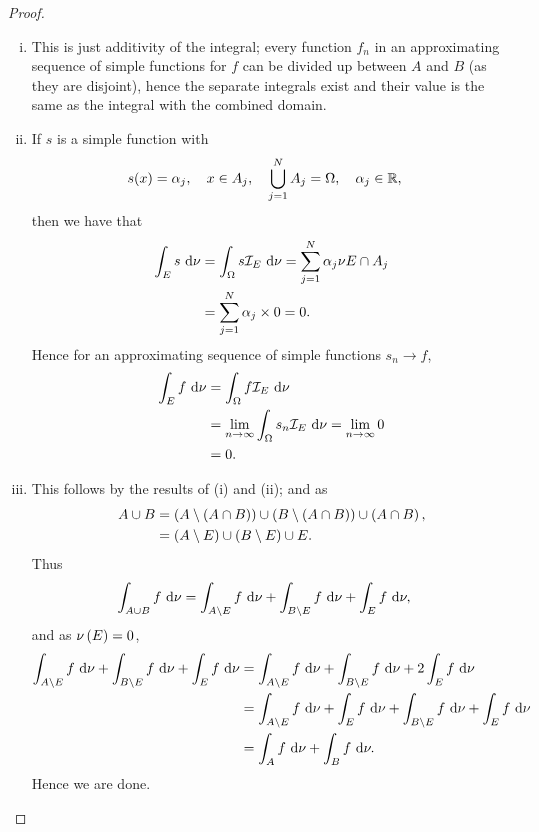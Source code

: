 \documentclass[11pt]{report}
\begin{document}
\begin{proof}
	\begin{enumerate}[(i)]
		\item This is just additivity of the integral; every function $f_n$ in an approximating sequence of simple functions for $f$ can be divided up between $A$ and $B$ (as they are disjoint), hence the separate integrals exist and their value is the same as the integral with the combined domain.
		\item If $s$ is a simple function with
		\begin{align*}
			s(x) &= \alpha_j, \quad x\in A_j, \quad \bigcup_{j=1}^{N} A_j=\Omega, \quad \alpha_j\in\mathbb{R},
		\end{align*}
		then we have that
		\begin{align*}
			\int_{E}s \ \mathrm{d}\nu &= \int_{\Omega}s\mathcal{I}_{E} \ \mathrm{d}\nu = \sum_{j=1}^{N} \alpha_j \nu{E\cap A_j} \\
			&= \sum_{j=1}^{N} \alpha_j\times0 = 0.
		\end{align*}
		Hence for an approximating sequence of simple functions $s_n\rightarrow f$,
		\begin{align*}
			\int_{E}f \ \mathrm{d}\nu &= \int_{\Omega}f\mathcal{I}_{E} \ \mathrm{d}\nu \\
			&= \lim_{n\rightarrow\infty}\int_{\Omega}s_n\mathcal{I}_{E} \ \mathrm{d}\nu = \lim_{n\rightarrow\infty}0 \\
			&= 0.
		\end{align*}
		\item This follows by the results of (i) and (ii); and as
		\begin{align*}
			A\cup B &= \left( A\setminus\left( A\cap B \right) \right) \cup \left( B\setminus\left( A\cap B \right) \right) \cup \left( A\cap B \right), \\
			&= \left( A\setminus E \right) \cup \left( B\setminus E \right) \cup E.
		\end{align*}
		Thus
		\begin{align*}
			\int_{A\cup B}f \ \mathrm{d}\nu &= \int_{A\setminus E}f \ \mathrm{d}\nu + \int_{B\setminus E}f \ \mathrm{d}\nu + \int_{E}f \ \mathrm{d}\nu,
		\end{align*}
		and as $\nu\left( E \right)=0$,
		\begin{align*}
			\int_{A\setminus E}f \ \mathrm{d}\nu + \int_{B\setminus E}f \ \mathrm{d}\nu + \int_{E}f \ \mathrm{d}\nu
			&= \int_{A\setminus E}f \ \mathrm{d}\nu + \int_{B\setminus E}f \ \mathrm{d}\nu + 2\int_{E}f \ \mathrm{d}\nu \\
			&= \int_{A\setminus E}f \ \mathrm{d}\nu + \int_{E}f \ \mathrm{d}\nu + \int_{B\setminus E}f \ \mathrm{d}\nu + \int_{E}f \ \mathrm{d}\nu \\
			&= \int_{A}f \ \mathrm{d}\nu + \int_{B}f \ \mathrm{d}\nu.
		\end{align*}
		Hence we are done.
	\end{enumerate}
\end{proof}
\end{document}
